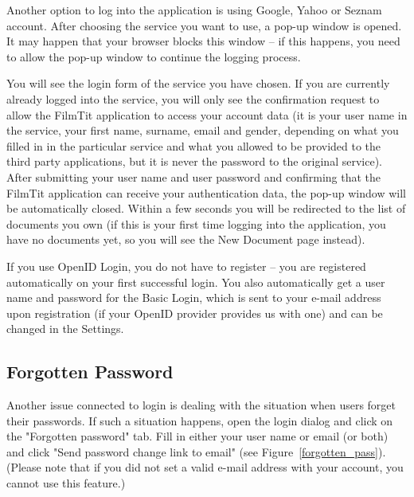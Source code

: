 Another option to log into the application is using Google, Yahoo or Seznam account. After choosing the service you want to use, a pop-up window is opened. It may happen that your browser blocks this window -- if this happens, you need to allow the pop-up window to continue the logging process.

You will see the login form of the service you have chosen. If you are currently already logged into the service, you will only see the confirmation request to allow the FilmTit application to access your account data (it is your user name in the service, your first name, surname, email and gender, depending on what you filled in in the particular service and what you allowed to be provided to the third party applications, but it is never the password to the original service). 
After submitting your user name and user password and confirming that the FilmTit application can receive your authentication data, the pop-up window will be automatically closed. Within a few seconds you will be redirected to the list of documents you own (if this is your first time logging into the application, you have no documents yet, so you will see the New Document page instead).

If you use OpenID Login, you do not have to register -- you are registered automatically on your first successful login. You also automatically get a user name and password for the Basic Login, which is sent to your e-mail address upon registration (if your OpenID provider provides us with one) and can be changed in the Settings.

\subsection{Forgotten Password}

Another issue connected to login is dealing with the situation when users forget their passwords. If such a situation happens, open the login dialog and click on the "Forgotten password" tab. Fill in either your user name or email (or both) and click "Send password change link to email" (see Figure~\ref{forgotten_pass}). (Please note that if you did not set a valid e-mail address with your account, you cannot use this feature.)

